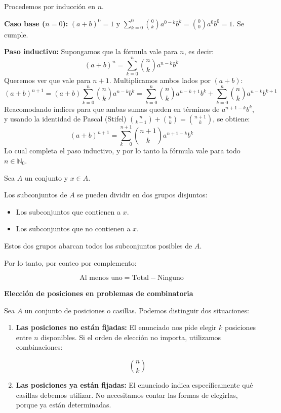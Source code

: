 \begin{demostracion}
    Procedemos por inducción en $n$.

    \textbf{Caso base ($n=0$):} $(a+b)^0 = 1$ y $\sum_{k=0}^{0} \binom{0}{k} a^{0-k}b^k = \binom{0}{0}a^0b^0 = 1$. Se cumple.

    \textbf{Paso inductivo:} Supongamos que la fórmula vale para $n$, es decir:
    \[
    (a+b)^n = \sum_{k=0}^{n} \binom{n}{k} a^{n-k} b^k
    \]
    Queremos ver que vale para $n+1$. Multiplicamos ambos lados por $(a+b)$:
    \[
    (a+b)^{n+1} = (a+b)\sum_{k=0}^{n} \binom{n}{k} a^{n-k} b^k = \sum_{k=0}^{n} \binom{n}{k} a^{n-k+1} b^k + \sum_{k=0}^{n} \binom{n}{k} a^{n-k} b^{k+1}
    \]
    Reacomodando índices para que ambas sumas queden en términos de $a^{n+1-k}b^k$, y usando la identidad de Pascal (Stifel) $\binom{n}{k-1}+\binom{n}{k} = \binom{n+1}{k}$, se obtiene:
    \[
    (a+b)^{n+1} = \sum_{k=0}^{n+1} \binom{n+1}{k} a^{n+1-k} b^k
    \]
    Lo cual completa el paso inductivo, y por lo tanto la fórmula vale para todo $n \in \mathbb{N}_0$.
\end{demostracion}


\begin{definicion}
Sea $A$ un conjunto y $x \in A$.

Los subconjuntos de $A$ se pueden dividir en
dos grupos disjuntos:

\begin{itemize}
    \item Los subconjuntos que contienen a $x$.
    \item Los subconjuntos que no contienen a $x$.
\end{itemize}

Estos dos grupos abarcan todos los subconjuntos
posibles de $A$.

Por lo tanto, por conteo por complemento:

\[
\boxed{
\text{Al menos uno}
=
\text{Total}
-
\text{Ninguno}
}
\]
\end{definicion}

\begin{definicion}
\textbf{Elección de posiciones en problemas de combinatoria}

Sea $A$ un conjunto de posiciones o casillas. Podemos distinguir dos situaciones:

\begin{enumerate}
    \item \textbf{Las posiciones no están fijadas:}
    El enunciado nos pide elegir $k$ posiciones entre $n$ disponibles.
    Si el orden de elección no importa, utilizamos combinaciones:

    \[
        \binom{n}{k}
    \]

    \item \textbf{Las posiciones ya están fijadas:}
    El enunciado indica específicamente qué casillas debemos utilizar.
    No necesitamos contar las formas de elegirlas, porque ya están determinadas.
\end{enumerate}

\end{definicion}

